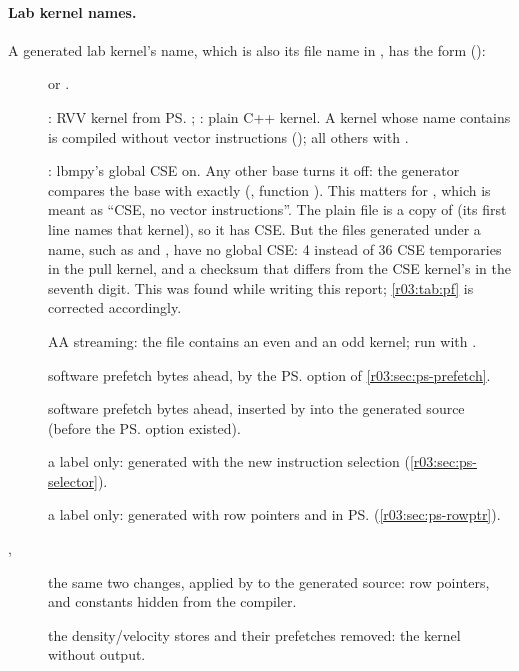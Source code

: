 \paragraph{Lab kernel names.} A generated lab kernel's name, which is also its file name in
, has the form 
():
\begin{description}
  \item[]  or .
  \item[] : RVV kernel from \ps{}; : plain C++ kernel.
        A  kernel whose name contains  is compiled without vector
        instructions (); all others with
        .
  \item[] : lbmpy's global CSE on. Any other base turns it off: the
        generator compares the base with  exactly (,
        function ). This matters for , which is meant as ``CSE, no
        vector instructions''. The plain file  is a copy of
         (its first line names that kernel), so it has CSE. But the
        files generated under a  name, such as
         and , have no
        global CSE: 4 instead of 36 CSE temporaries in the pull kernel, and a checksum that
        differs from the CSE kernel's in the seventh digit. This was found while writing this
        report; \cref{r03:tab:pf} is corrected accordingly.
  \item[] AA streaming: the file contains an even and an odd kernel; run with
        .
  \item[] software prefetch  bytes ahead, by the \ps{} option of
        \cref{r03:sec:ps-prefetch}.
  \item[] software prefetch  bytes ahead, inserted by  into the
        generated source (before the \ps{} option existed).
  \item[] a label only: generated with the new instruction selection
        (\cref{r03:sec:ps-selector}).
  \item[] a label only: generated with row pointers and  in \ps{}
        (\cref{r03:sec:ps-rowptr}).
  \item[, ] the same two changes, applied by  to the
        generated source: row pointers, and constants hidden from the compiler.
  \item[] the density/velocity stores and their prefetches removed: the kernel
        without output.
\end{description}
